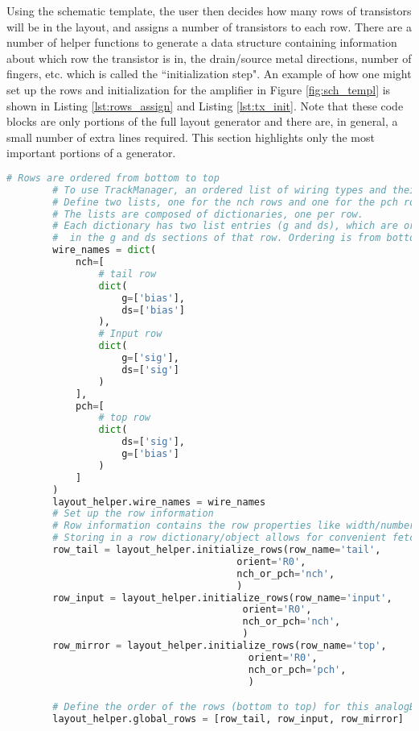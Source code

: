 Using the schematic template, the user then decides how many rows of transistors will be in the layout, and assigns a number of transistors to each row. There are a number of helper functions to generate a data structure containing information about which row the transistor is in, the drain/source metal directions, number of fingers, etc. which is called the ``initialization step". An example of how one might set up the rows and initialization for the amplifier in Figure \ref{fig:sch_templ} is shown in Listing \ref{lst:rows_assign} and Listing \ref{lst:tx_init}. Note that these code blocks are only portions of the full layout generator and there are, in general, a small number of extra lines required. This section highlights only the most important portions of a generator.
\begin{lstlisting}[language=Python, caption=Creating rows for transistors, label={lst:rows_assign}, float]
        # Rows are ordered from bottom to top
        # To use TrackManager, an ordered list of wiring types and their locations must be provided.
        # Define two lists, one for the nch rows and one for the pch rows
        # The lists are composed of dictionaries, one per row.
        # Each dictionary has two list entries (g and ds), which are ordered lists of what wire types will be present
        #  in the g and ds sections of that row. Ordering is from bottom to top of the design.
        wire_names = dict(
            nch=[
                # tail row
                dict(
                    g=['bias'],
                    ds=['bias']
                ),
                # Input row
                dict(
                    g=['sig'],
                    ds=['sig']
                )
            ],
            pch=[
                # top row
                dict(
                    ds=['sig'],
                    g=['bias']
                )
            ]
        )
        layout_helper.wire_names = wire_names
        # Set up the row information
        # Row information contains the row properties like width/number of fins, orientation, intent, etc.
        # Storing in a row dictionary/object allows for convenient fetching of data in later functions
        row_tail = layout_helper.initialize_rows(row_name='tail',
                                        orient='R0',
                                        nch_or_pch='nch',
                                        )
        row_input = layout_helper.initialize_rows(row_name='input',
                                         orient='R0',
                                         nch_or_pch='nch',
                                         )
        row_mirror = layout_helper.initialize_rows(row_name='top',
                                          orient='R0',
                                          nch_or_pch='pch',
                                          )

        # Define the order of the rows (bottom to top) for this analogBase cell
        layout_helper.global_rows = [row_tail, row_input, row_mirror]
\end{lstlisting}
